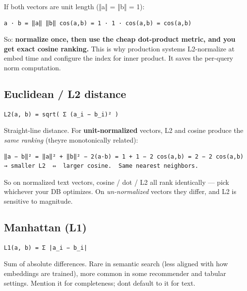 \documentclass[11pt]{article}
\begin{document}
If both vectors are unit length (‖a‖ = ‖b‖ = 1):

\setcodelang{}

\begin{verbatim}
a · b = ‖a‖ ‖b‖ cos(a,b) = 1 · 1 · cos(a,b) = cos(a,b)
\end{verbatim}

So: \textbf{normalize once, then use the cheap dot-product metric, and you get exact cosine ranking.} This is why production systems L2-normalize at embed time and configure the index for inner product. It saves the per-query norm computation.

\subsection{Euclidean / L2 distance}\label{euclidean--l2-distance}

\setcodelang{}

\begin{verbatim}
L2(a, b) = sqrt( Σ (a_i − b_i)² )
\end{verbatim}

Straight-line distance. For \textbf{unit-normalized} vectors, L2 and cosine produce the \emph{same ranking} (they\textquotesingle re monotonically related):

\setcodelang{}

\begin{verbatim}
‖a − b‖² = ‖a‖² + ‖b‖² − 2(a·b) = 1 + 1 − 2 cos(a,b) = 2 − 2 cos(a,b)
→ smaller L2  ⇔  larger cosine.  Same nearest neighbors.
\end{verbatim}

So on normalized text vectors, cosine / dot / L2 all rank identically --- pick whichever your DB optimizes. On \emph{un-normalized} vectors they differ, and L2 is sensitive to magnitude.

\subsection{Manhattan (L1)}\label{manhattan-l1}

\setcodelang{}

\begin{verbatim}
L1(a, b) = Σ |a_i − b_i|
\end{verbatim}

Sum of absolute differences. Rare in semantic search (less aligned with how embeddings are trained), more common in some recommender and tabular settings. Mention it for completeness; don\textquotesingle t default to it for text.
\end{document}
